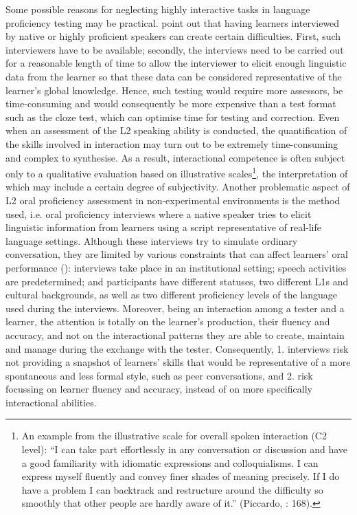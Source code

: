 Some possible reasons for neglecting highly interactive tasks in language proficiency testing may be practical. \citet{HeYoung1998} point out that having learners interviewed by native or highly proficient speakers can create certain difficulties. First, such interviewers have to be available; secondly, the interviews need to be carried out for a reasonable length of time to allow the interviewer to elicit enough linguistic data from the learner so that these data can be considered representative of the learner’s global knowledge. Hence, such testing would require more assessors, be time-consuming and would consequently be more expensive than a test format such as the cloze test, which can optimise time for testing and correction. Even when an assessment of the L2 speaking ability is conducted, the quantification of the skills involved in interaction may turn out to be extremely time-consuming and complex to synthesise. As a result, interactional competence is often subject only to a qualitative evaluation based on illustrative scales\footnote{An example from the illustrative scale for overall spoken interaction (C2 level): “I can take part effortlessly in any conversation or discussion and have a good familiarity with idiomatic expressions and colloquialisms. I can express myself fluently and convey finer shades of meaning precisely. If I do have a problem I can backtrack and restructure around the difficulty so smoothly that other people are hardly aware of it.” (Piccardo, \citealt{GoodierNorth2018}: 168).}, the interpretation of which may include a certain degree of subjectivity. Another problematic aspect of L2 oral proficiency assessment in non-experimental environments is the method used, i.e. oral proficiency interviews where a native speaker tries to elicit linguistic information from learners using a script representative of real-life language settings. Although these interviews try to simulate ordinary conversation, they are limited by various constraints that can affect learners’ oral performance (\citealt{HeYoung1998}): interviews take place in an institutional setting; speech activities are predetermined; and participants have different statuses, two different L1s and cultural backgrounds, as well as two different proficiency levels of the language used during the interviews. Moreover, being an interaction among a tester and a learner, the attention is totally on the learner’s production, their fluency and accuracy, and not on the interactional patterns they are able to create, maintain and manage during the exchange with the tester. Consequently, 1. interviews risk not providing a snapshot of learners’ skills that would be representative of a more spontaneous and less formal style, such as peer conversations, and 2. risk focussing on learner fluency and accuracy, instead of on more specifically interactional abilities.

